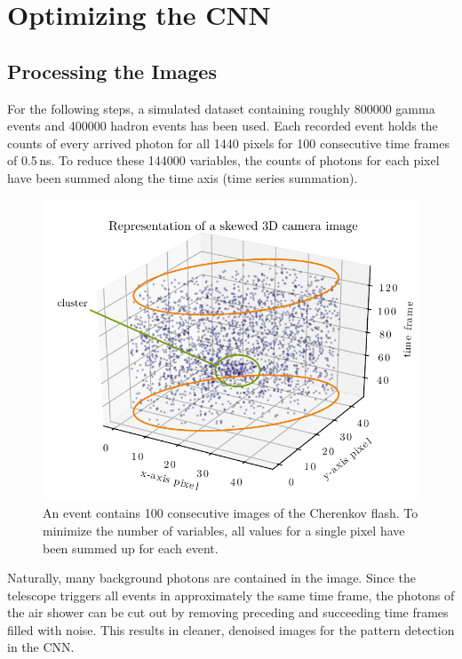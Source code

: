 \chapter{Optimizing the CNN}%

\section{Processing the Images}
For the following steps, a simulated dataset containing roughly \num{800000} gamma events
and \num{400000} hadron events has been used.
Each recorded event holds the counts of every arrived photon for all \num{1440} pixels
for \num{100} consecutive time frames of \num{0.5}\,\si{\nano\second}.
To reduce these \num{144000} variables,
the counts of photons for each pixel have been summed along the time axis (time series summation).

\begin{figure}
    \centering
    \includegraphics[scale=0.75]{Plots/3d_Camera_Image.pdf}
    \caption{An event contains \num{100} consecutive images of the Cherenkov flash. To minimize the number of variables, all values for a single pixel have been summed up for each event.}
    \label{fig:example_event}
\end{figure}

Naturally, many background photons are contained in the image.
Since the telescope triggers all events in approximately the same time frame,
the photons of the air shower can be cut out by removing preceding and succeeding time frames filled with noise.
This results in cleaner, denoised images for the pattern detection in the CNN.

